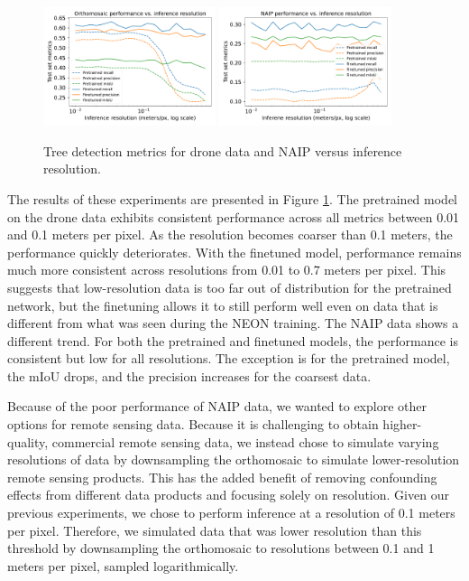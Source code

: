 \begin{figure}
    \centering
    \includegraphics[width=0.45\textwidth]{figs/results/tree_detections/drone_metrics.pdf}
    \includegraphics[width=0.45\textwidth]{figs/results/tree_detections/NAIP_metrics.pdf}
    \caption{Tree detection metrics for drone data and NAIP versus inference resolution.}
    \label{fig:results:inference_resolution}
\end{figure}

The results of these experiments are presented in Figure \ref{fig:results:inference_resolution}. The pretrained model on the drone data exhibits consistent performance across all metrics between 0.01 and 0.1 meters per pixel. As the resolution becomes coarser than 0.1 meters, the performance quickly deteriorates. With the finetuned model, performance remains much more consistent across resolutions from 0.01 to 0.7 meters per pixel. This suggests that low-resolution data is too far out of distribution for the pretrained network, but the finetuning allows it to still perform well even on data that is different from what was seen during the NEON training. The NAIP data shows a different trend. For both the pretrained and finetuned models, the performance is consistent but low for all resolutions. The exception is for the pretrained model, the mIoU drops, and the precision increases for the coarsest data.

Because of the poor performance of NAIP data, we wanted to explore other options for remote sensing data. Because it is challenging to obtain higher-quality, commercial remote sensing data, we instead chose to simulate varying resolutions of data by downsampling the orthomosaic to simulate lower-resolution remote sensing products. This has the added benefit of removing confounding effects from different data products and focusing solely on resolution. Given our previous experiments, we chose to perform inference at a resolution of 0.1 meters per pixel. Therefore, we simulated data that was lower resolution than this threshold by downsampling the orthomosaic to resolutions between 0.1 and 1 meters per pixel, sampled logarithmically. 

